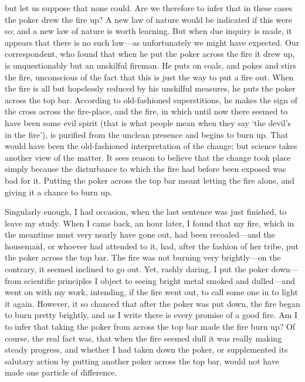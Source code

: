 \documentclass[letterpaper,12pt,oneside,openany]{memoir}
\begin{document}
but let us suppose that none could. Are we therefore
to infer that in these cases the poker drew the fire up?
A new law of nature would be indicated if this were
so; and a new law of nature is worth learning. But
when due inquiry is made, it appears that there is no
such law---as unfortunately we might have expected.
Our correspondent, who found that when he put the
poker across the fire it drew up, is unquestionably but
an unskilful fireman. He puts on coals, and pokes and
stirs the fire, unconscious of the fact that this is just
the way to put a fire out. When the fire is all but
hopelessly reduced by his unskilful measures, he puts
the poker across the top bar. According to old-fashioned
superstitions, he makes the sign of the cross
across the fire-place, and the fire, in which until now
there seemed to have been some evil spirit (that is
what people mean when they say `the devil's in the
fire'), is purified from the unclean presence and
begins to burn up. That would have been the old-fashioned
interpretation of the change; but science
takes another view of the matter. It sees reason to
believe that the change took place simply because
the disturbance to which the fire had before been
exposed was bad for it. Putting the poker across
the top bar meant letting the fire alone, and giving
it a chance to burn up.

Singularly enough, I had occasion, when the last
sentence was just finished, to leave my study. When
I came back, an hour later, I found that my fire, which
in the meantime must very nearly have gone out, had
been recoaled---and the housemaid, or whoever had
attended to it, had, after the fashion of her tribe, put the
poker across the top bar. The fire was not burning
very brightly---on the contrary, it seemed inclined to
go out. Yet, rashly daring, I put the poker down---from
scientific principles I object to seeing bright
metal smoked and dulled---and went on with my work,
intending, if the fire went out, to call some one in to
light it again. However, it so chanced that after the
poker was put down, the fire began to burn pretty
brightly, and as I write there is every promise of a
good fire. Am I to infer that taking the poker from
across the top bar made the fire burn up? Of course,
the real fact was, that when the fire seemed dull it was
really making steady progress, and whether I had
taken down the poker, or supplemented its salutary
action by putting another poker across the top bar,
would not have made one particle of difference.
\end{document}
